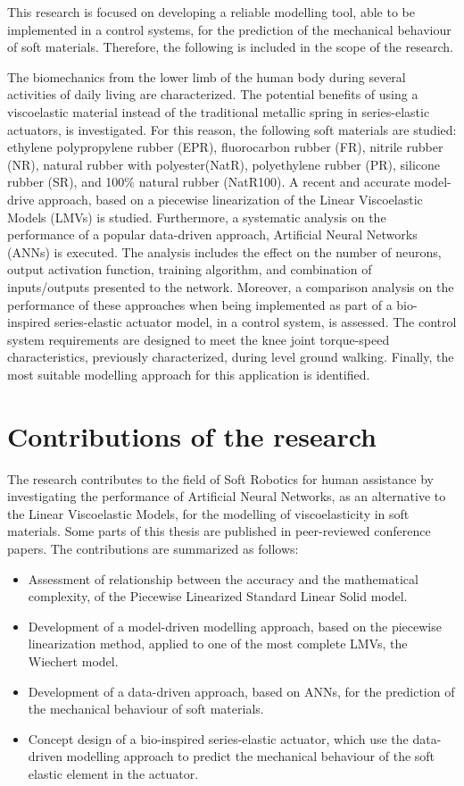 This research is focused on developing a reliable modelling tool, able to be implemented in a control systems, for the prediction of the mechanical behaviour of soft materials. Therefore, the following is included in the scope of the research. 

The biomechanics from the lower limb of the human body during several activities of daily living are characterized. The potential benefits of using a viscoelastic material instead of the traditional metallic spring in series-elastic actuators, is investigated. For this reason, the following soft materials are studied: ethylene polypropylene rubber (EPR), fluorocarbon rubber (FR), nitrile rubber (NR), natural rubber with polyester(NatR),  polyethylene  rubber  (PR),  silicone  rubber  (SR), and  100\% natural rubber (NatR100). A recent and accurate model-drive approach, based on a piecewise linearization of the Linear Viscoelastic Models (LMVs) is studied. Furthermore, a systematic analysis on the performance of a popular data-driven approach, Artificial Neural Networks (ANNs) is executed. The analysis includes the effect on the number of neurons, output activation function, training algorithm, and combination of inputs/outputs presented to the network. Moreover, a comparison analysis on the performance of these approaches when being implemented as part of a bio-inspired series-elastic actuator model, in a control system, is assessed. The control system requirements are designed to meet the knee joint torque-speed characteristics, previously characterized, during level ground walking. Finally, the most suitable modelling approach for this application is identified.

\section{Contributions of the research}

The research contributes to the field of Soft Robotics for human assistance by investigating the performance of Artificial Neural Networks, as an alternative to the Linear Viscoelastic Models, for the modelling of viscoelasticity in soft materials. Some parts of this thesis are published in peer-reviewed conference papers. The contributions are summarized as follows:

\begin{itemize}
    \item Assessment of relationship between the accuracy and the mathematical complexity, of the Piecewise Linearized Standard Linear Solid model.
    \item Development of a model-driven modelling approach, based on the piecewise linearization method, applied to one of the most complete LMVs, the Wiechert model.
    \item Development of a data-driven approach, based on ANNs, for the prediction of the mechanical behaviour of soft materials.
    \item Concept design of a bio-inspired series-elastic actuator, which use the data-driven modelling approach to predict the mechanical behaviour of the soft elastic element in the actuator.
\end{itemize}

